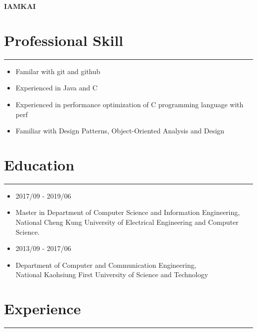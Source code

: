 \documentclass[12pt]{article}
\begin{document}
\begin{center}

\noindent  \LARGE{\textbf{IAMKAI}}  
\normalsize
\end{center}

	\section*{Professional Skill}
	\nointerlineskip
	\noindent\rule{450pt}{0.4pt}
	
	\begin{itemize}
	\item Familar with git and github
  	\item Experienced in Java and C
  	\item Experienced in performance optimization of C programming language with perf
  	\item Familiar with Design Patterns, Object-Oriented Analysis and Design
	\end{itemize}


	
	\section*{Education}
	\nointerlineskip
	\noindent\rule{450pt}{0.4pt}
	  \begin{itemize}
	  \item 2017/09 - 2019/06
	  \vspace{-5pt}
	  \item[] Master in Department of Computer Science and Information Engineering,
      \\ National Cheng Kung University of Electrical Engineering and Computer Science.
	  \end{itemize}
	  
	  
	  \begin{itemize}
	  	\item 2013/09 - 2017/06
	  	\vspace{-5pt}
	  	\item[]       Department of Computer and Communication Engineering, 
      \\National Kaohsiung First University of Science and Technology
	  \end{itemize}


	\section*{Experience}
	\nointerlineskip
	\noindent\rule{450pt}{0.4pt}
	
\end{document}
